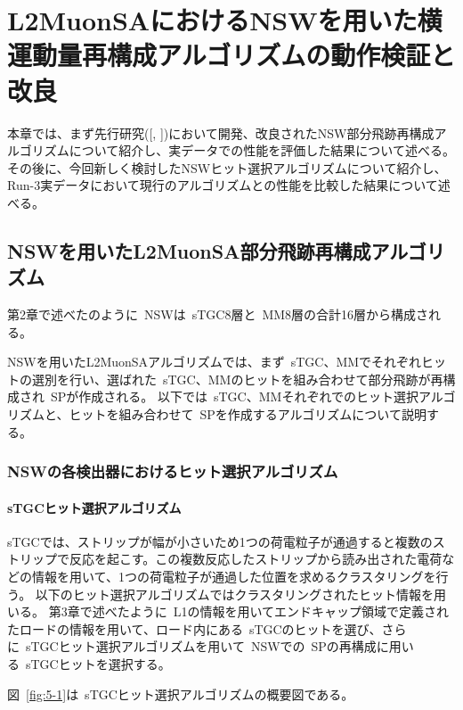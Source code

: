 \chapter{L2MuonSAにおけるNSWを用いた横運動量再構成アルゴリズムの動作検証と改良}\label{chapter5}


本章では、まず先行研究([\cite{article:kumaoka}, \cite{article:noguchi}])において開発、改良されたNSW部分飛跡再構成アルゴリズムについて紹介し、実データでの性能を評価した結果について述べる。
その後に、今回新しく検討したNSWヒット選択アルゴリズムについて紹介し、Run-3実データにおいて現行のアルゴリズムとの性能を比較した結果について述べる。

\newpage

\section{NSWを用いたL2MuonSA部分飛跡再構成アルゴリズム}\label{5-1}
第2章で述べたのように~NSWは~sTGC8層と~MM8層の合計16層から構成される。

NSWを用いたL2MuonSAアルゴリズムでは、まず~sTGC、MMでそれぞれヒットの選別を行い、選ばれた~sTGC、MMのヒットを組み合わせて部分飛跡が再構成され~SPが作成される。
以下では~sTGC、MMそれぞれでのヒット選択アルゴリズムと、ヒットを組み合わせて~SPを作成するアルゴリズムについて説明する。

\subsection{NSWの各検出器におけるヒット選択アルゴリズム}\label{5-1-1}
\subsubsection{sTGCヒット選択アルゴリズム}
sTGCでは、ストリップが幅が小さいため1つの荷電粒子が通過すると複数のストリップで反応を起こす。この複数反応したストリップから読み出された電荷などの情報を用いて、1つの荷電粒子が通過した位置を求めるクラスタリングを行う。
以下のヒット選択アルゴリズムではクラスタリングされたヒット情報を用いる。
第3章で述べたように~L1の情報を用いてエンドキャップ領域で定義されたロードの情報を用いて、ロード内にある~sTGCのヒットを選び、さらに~sTGCヒット選択アルゴリズムを用いて~NSWでの~SPの再構成に用いる~sTGCヒットを選択する。

図~\ref{fig:5-1}は~sTGCヒット選択アルゴリズムの概要図である。

